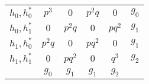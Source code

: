 \begin{table}[!h]
\begin{minipage}{0.5\textwidth}
\begin{tabular}[t]{c|c|c|c|c|c}
  $h_{0}, h^*_{0}$   & $p^{3}$   & $0$       & $p^{2}q$  & $0$       & $g_{0}$ \\ \cline{2-5}
\rule{0pt}{3ex}\rule[-2ex]{0pt}{0pt}
  $h_{0}, h^*_{1}$   & $0$       & $p^{2}q$  & $0$       & $pq^{2}$  & $g_{1}$ \\ \cline{2-5}
\rule{0pt}{3ex}\rule[-2ex]{0pt}{0pt}
  $h_{1}, h^*_{0}$   & $p^{2}q$  & $0$       & $pq^{2}$  & $0$       & $g_{1}$ \\ \cline{2-5}
\rule{0pt}{3ex}\rule[-2ex]{0pt}{0pt}
  $h_{1}, h^*_{1}$   & $0$       & $pq^{2}$  & $0$       & $q^{3}$   & $g_{2}$ \\ \cline{2-5}
  \multicolumn{1}{c}{} &
\multicolumn{1}{c}{$g_{0}$} &
\multicolumn{1}{c}{$g_{1}$} &
\multicolumn{1}{c}{$g_{1}$} &
\multicolumn{1}{c}{$g_{2}$} &
\multicolumn{1}{c}{}
\end{tabular}
\end{minipage}

\end{table}
